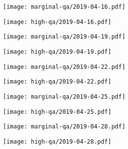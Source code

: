 \documentclass{article}
\begin{document}
\begin{figure}[H]
	\ContinuedFloat
	\centering
	\begin{subfigure}{0.48\linewidth}
		\texttt{[image: marginal-qa/2019-04-16.pdf]}
	\end{subfigure}
	\begin{subfigure}{0.48\linewidth}
		\texttt{[image: high-qa/2019-04-16.pdf]}
	\end{subfigure}
	\begin{subfigure}{0.48\linewidth}
		\texttt{[image: marginal-qa/2019-04-19.pdf]}
	\end{subfigure}
	\begin{subfigure}{0.48\linewidth}
		\texttt{[image: high-qa/2019-04-19.pdf]}
	\end{subfigure}
	\begin{subfigure}{0.48\linewidth}
		\texttt{[image: marginal-qa/2019-04-22.pdf]}
	\end{subfigure}
	\begin{subfigure}{0.48\linewidth}
		\texttt{[image: high-qa/2019-04-22.pdf]}
	\end{subfigure}
	\begin{subfigure}{0.48\linewidth}
		\texttt{[image: marginal-qa/2019-04-25.pdf]}
	\end{subfigure}
	\begin{subfigure}{0.48\linewidth}
		\texttt{[image: high-qa/2019-04-25.pdf]}
	\end{subfigure}
	\begin{subfigure}{0.48\linewidth}
		\texttt{[image: marginal-qa/2019-04-28.pdf]}
	\end{subfigure}
	\begin{subfigure}{0.48\linewidth}
		\texttt{[image: high-qa/2019-04-28.pdf]}
	\end{subfigure}
\end{figure}
\end{document}
